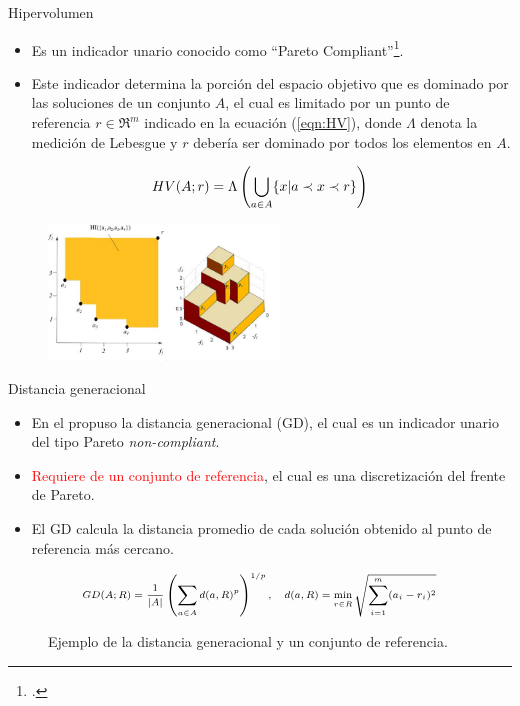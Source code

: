 \documentclass{beamer}
\begin{document}
\begin{frame}{Hipervolumen}
\begin{itemize}
\scriptsize
\justifying
\item Es un indicador unario conocido como ``Pareto Compliant''\footcite{zitzler1999evolutionary}.
\item Este indicador determina la porción del espacio objetivo que es dominado por las soluciones de un conjunto $A$, el cual es limitado por un punto de referencia $r \in \Re^m$ indicado en la ecuación (\ref{eqn:HV}), donde $\Lambda$ denota la medición de Lebesgue y $r$ debería ser dominado por todos los elementos en $A$.
\end{itemize}
\begin{equation}\label{eqn:HV}
\scriptsize
    HV(A;r) = \Lambda \left (  \bigcup_{a \in A} \{ x | a \prec x \prec r \} \right )
\end{equation}

\begin{figure}[H]
\centering
\includegraphics[width=0.55\textwidth]{HV.jpg}
\end{figure}
\end{frame}

\begin{frame}{Distancia generacional}
\begin{itemize}
\justifying
\scriptsize
\item En el \citeyear{Joel:GD} \citeauthor{Joel:GD} propuso la distancia generacional (GD), el cual es un indicador unario del tipo Pareto \textit{non-compliant}.
\item \textcolor{red}{Requiere de un conjunto de referencia}, el cual es una discretización del frente de Pareto.
\item El GD calcula la distancia promedio de cada solución obtenido al punto de referencia más cercano.
\end{itemize}
\begin{equation*}
\scriptsize
\begin{split}
GD(A; R) = \frac{1}{|A|} \left (   \sum_{a \in A} d(a, R)^p \right)^{1/p}, \quad d(a, R) = \min_{r \in R} \sqrt{\sum_{i=1}^m (a_i - r_i)^2}
\end{split}
\end{equation*}
\begin{figure}[H]
\centering

\caption{\scriptsize Ejemplo de la distancia generacional y un conjunto de referencia.} 
\end{figure}
\end{frame}
\end{document}
